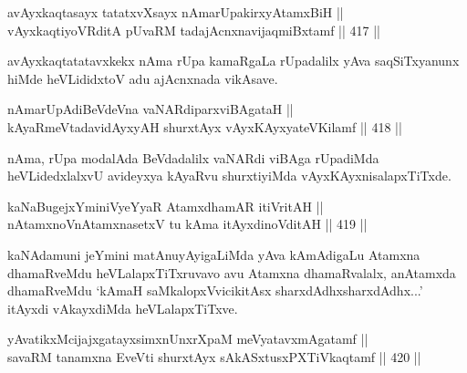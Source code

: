 \begin{shl}
avAyxkaqtasayx tatatxvXsayx nAmarUpakirxyAtamxBiH || \\
vAyxkaqtiyoVRditA pUvaRM tadajAcnxnavijaqmiBxtamf \hfill || 417 ||  
\end{shl}

\begin{artha}
avAyxkaqtatatavxkekx nAma rUpa kamaRgaLa rUpadalilx yAva saqSiTxyanunx
hiMde heVLididxtoV adu ajAcnxnada vikAsave.
\end{artha}


\begin{shl}
nAmarUpAdiBeVdeVna vaNARdiparxviBAgataH || \\
kAyaRmeVtadavidAyxyAH shurxtAyx vAyxKAyxyateV\s Kilamf \hfill || 418 ||  
\end{shl}

\begin{artha}
nAma, rUpa modalAda BeVdadalilx vaNARdi viBAga rUpadiMda
heVLidedxlalxvU avideyxya kAyaRvu shurxtiyiMda vAyxKAyxnisalapxTiTxde.
\end{artha}


\begin{shl}
kaNaBugejxYminiVyeYyaR AtamxdhamAR itiVritAH || \\
nA\s \s tamxnoV\s nAtamxnasetxV tu kAma itAyxdinoVditAH \hfill || 419 || 
\end{shl}

\begin{artha}
kaNAdamuni jeYmini matAnuyAyigaLiMda yAva kAmAdigaLu Atamxna
dhamaRveMdu heVLalapxTiTxruvavo avu Atamxna dhamaRvalalx,
anAtamxda dhamaRveMdu `kAmaH saMkalopxVvicikitAsx sharxdAdhx\s sharxdAdhx...' itAyxdi vAkayxdiMda heVLalapxTiTxve.
\end{artha}



\begin{shl}
yAvatikxMcijajxgatayxsimxnUnxrXpaM meVyatavxmAgatamf || \\
savaRM tanamxna EveVti shurxtAyx sAkASxtusxPXTiVkaqtamf \hfill || 420 ||  
\end{shl}

